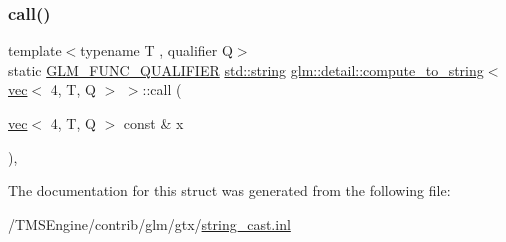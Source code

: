 \subsubsection{\texorpdfstring{call()}{call()}}
{\footnotesize\ttfamily template$<$typename T , qualifier Q$>$ \\
static \hyperlink{setup_8hpp_a33fdea6f91c5f834105f7415e2a64407}{G\+L\+M\+\_\+\+F\+U\+N\+C\+\_\+\+Q\+U\+A\+L\+I\+F\+I\+ER} \hyperlink{_s_d_l__opengl__glext_8h_ae84541b4f3d8e1ea24ec0f466a8c568b}{std\+::string} \hyperlink{structglm_1_1detail_1_1compute__to__string}{glm\+::detail\+::compute\+\_\+to\+\_\+string}$<$ \hyperlink{structglm_1_1vec}{vec}$<$ 4, T, Q $>$ $>$\+::call (\begin{DoxyParamCaption}\item[{\hyperlink{structglm_1_1vec}{vec}$<$ 4, T, Q $>$ const \&}]{x }\end{DoxyParamCaption})\hspace{0.3cm}{\ttfamily [inline]}, {\ttfamily [static]}}



The documentation for this struct was generated from the following file\+:\begin{DoxyCompactItemize}
\item 
/\+T\+M\+S\+Engine/contrib/glm/gtx/\hyperlink{string__cast_8inl}{string\+\_\+cast.\+inl}\end{DoxyCompactItemize}
